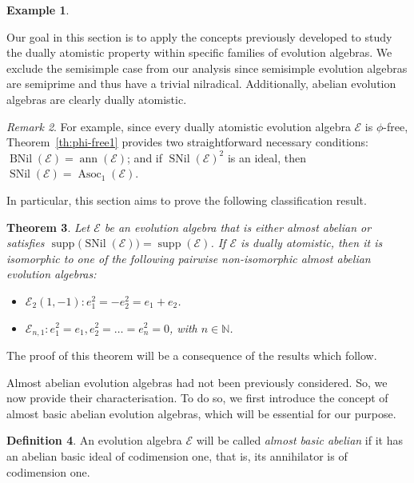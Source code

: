 \documentclass[12pt,reqno]{amsart}
\newtheorem{theorem}{Theorem}[section]
\theoremstyle{definition}
\newtheorem{definition}[theorem]{Definition}
\newtheorem{example}[theorem]{Example}
\theoremstyle{remark}
\newtheorem{remark}[theorem]{Remark}
\DeclareMathOperator{\ann}{ann}
\DeclareMathOperator{\supp}{supp}
\DeclareMathOperator{\asoc}{Asoc}
\DeclareMathOperator{\bnil}{BNil}
\DeclareMathOperator{\snil}{SNil}
\numberwithin{equation}{section}
\begin{document}
\begin{example}
\begin{minipage}{0.25\textwidth}
\begin{center}
		\end{center}
	\end{minipage}
\end{example}	
 
Our goal in this section is to apply the concepts previously developed to study the dually atomistic property within specific families of evolution algebras. We exclude the semisimple case from our analysis since semisimple evolution algebras are semiprime and thus have a trivial nilradical.  Additionally, abelian evolution algebras are clearly dually atomistic. 
\begin{remark}
For example, since every dually atomistic evolution algebra $\mathcal{E}$ is $\phi$-free, Theorem~\ref{th:phi-free1} provides two straightforward necessary conditions: $\bnil(\mathcal{E})=\ann(\mathcal{E})$; and if $\snil(\mathcal{E})^2$ is an ideal, then $\snil(\mathcal{E})=\asoc_1(\mathcal{E})$. 
\end{remark}

In particular, this section aims to prove the following classification result.

\begin{theorem}\label{th:aa_dually}
Let $\mathcal{E}$ be an evolution algebra that is either almost abelian or satisfies $\supp\big(\snil(\mathcal{E})\big)=\supp(\mathcal{E})$. If $\mathcal{E}$ is dually atomistic, then it is isomorphic to one of the following pairwise non-isomorphic almost abelian evolution algebras: 
\begin{itemize}
	\item $\mathcal{E}_2(1,-1)\colon e_1^2=-e_2^2=e_1+e_2$.
	\item $\mathcal{E}_{n,1}\colon e_1^2=e_1,e_2^2=\dots=e_n^2=0$, with $n\in\mathbb{N}$.
\end{itemize}
\end{theorem}

The proof of this theorem will be a consequence of the results which follow.


Almost abelian evolution algebras had not been previously considered. So, we now provide their characterisation. To do so, we first introduce the concept of almost basic abelian evolution algebras, which will be essential for our purpose.
\begin{definition}
	An evolution algebra $\mathcal{E}$ will be called \textit{almost basic abelian} if it has an abelian basic ideal of codimension one, that is, its annihilator is of codimension one.
\end{definition}
\end{document}
